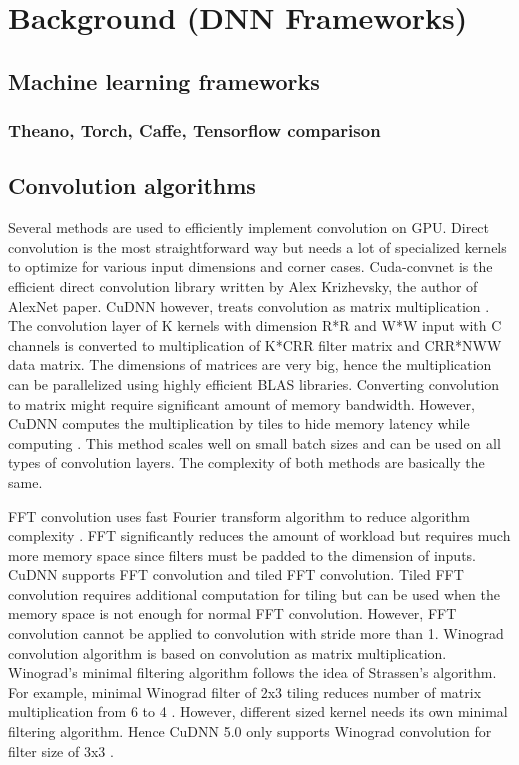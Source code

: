 \documentclass[conference]{IEEEtran}
\begin{document}
\section{Background (DNN Frameworks)}

\subsection{Machine learning frameworks}

\subsubsection{Theano, Torch, Caffe, Tensorflow comparison}

\subsection{Convolution algorithms}
Several methods are used to efficiently implement convolution on GPU.
Direct convolution is the most straightforward way but needs a lot of specialized kernels to optimize for various input dimensions and corner cases.
Cuda-convnet \cite{} is the efficient direct convolution library written by Alex Krizhevsky, the author of AlexNet paper.
CuDNN however, treats convolution as matrix multiplication \cite{}.
The convolution layer of K kernels with dimension R*R and W*W input with C channels is converted to multiplication of K*CRR filter matrix and CRR*NWW data matrix.
The dimensions of matrices are very big, hence the multiplication can be parallelized using highly efficient BLAS libraries.
Converting convolution to matrix might require significant amount of memory bandwidth.
However, CuDNN computes the multiplication by tiles to hide memory latency while computing \cite{}.
This method scales well on small batch sizes and can be used on all types of convolution layers.
The complexity of both methods are basically the same.

FFT convolution uses fast Fourier transform algorithm to reduce algorithm complexity \cite{}.
FFT significantly reduces the amount of workload but requires much more memory space since filters must be padded to the dimension of inputs.
CuDNN supports FFT convolution and tiled FFT convolution.
Tiled FFT convolution requires additional computation for tiling but can be used when the memory space is not enough for normal FFT convolution.
However, FFT convolution cannot be applied to convolution with stride more than 1.
Winograd convolution algorithm is based on convolution as matrix multiplication.
Winograd’s minimal filtering algorithm follows the idea of Strassen’s algorithm.
For example, minimal Winograd filter of 2x3 tiling reduces number of matrix multiplication from 6 to 4 \cite{}.
However, different sized kernel needs its own minimal filtering algorithm.
Hence CuDNN 5.0 only supports Winograd convolution for filter size of 3x3 \cite{}.
\end{document}
